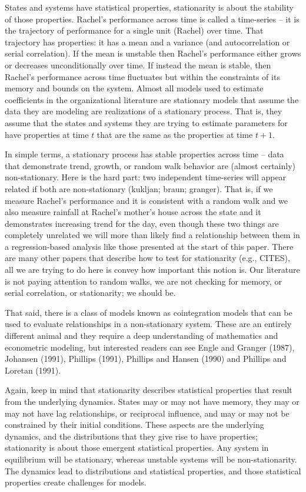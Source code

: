 \documentclass[english,,man]{apa6}
\theoremstyle{definition}
\theoremstyle{definition}
\theoremstyle{definition}
\theoremstyle{remark}
\begin{document}
States and systems have statistical properties, stationarity is about
the stability of those properties. Rachel's performance across time is
called a time-series -- it is the trajectory of performance for a single
unit (Rachel) over time. That trajectory has properties: it has a mean
and a variance (and autocorrelation or serial correlation). If the mean
is unstable then Rachel's performance either grows or decreases
unconditionally over time. If instead the mean is stable, then Rachel's
performance across time fluctuates but within the constraints of its
memory and bounds on the system. Almost all models used to estimate
coefficients in the organizational literature are stationary models that
assume the data they are modeling are realizations of a stationary
process. That is, they assume that the states and systems they are
trying to estimate parameters for have properties at time \(t\) that are
the same as the properties at time \(t + 1\).

In simple terms, a stationary process has stable properties across time
-- data that demonstrate trend, growth, or random walk behavior are
(almost certainly) non-stationary. Here is the hard part: two
independent time-series will appear related if both are non-stationary
(kukljan; braun; granger). That is, if we measure Rachel's performance
and it is consistent with a random walk and we also measure rainfall at
Rachel's mother's house across the state and it demonstrates increasing
trend for the day, even though these two things are completely unrelated
we will more than likely find a relationship between them in a
regression-based analysis like those presented at the start of this
paper. There are many other papers that describe how to test for
stationarity (e.g., CITES), all we are trying to do here is convey how
important this notion is. Our literature is not paying attention to
random walks, we are not checking for memory, or serial correlation, or
stationarity; we should be.

That said, there is a class of models known as cointegration models that
can be used to evaluate relationships in a non-stationary system. These
are an entirely different animal and they require a deep understanding
of mathematics and econometric modeling, but interested readers can see
Engle and Granger (1987), Johansen (1991), Phillips (1991), Phillips and
Hansen (1990) and Phillips and Loretan (1991).

Again, keep in mind that stationarity describes statistical properties
that result from the underlying dynamics. States may or may not have
memory, they may or may not have lag relationships, or reciprocal
influence, and may or may not be constrained by their initial
conditions. These aspects are the underlying dynamics, and the
distributions that they give rise to have properties; stationarity is
about those emergent statistical properties. Any system in equilibrium
will be stationary, whereas unstable systems will be non-stationarity.
The dynamics lead to distributions and statistical properties, and those
statistical properties create challenges for models.
\end{document}
